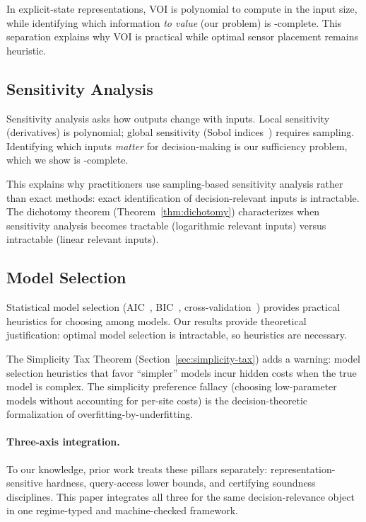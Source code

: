 In explicit-state representations, VOI is polynomial to compute in the input size, while identifying which information \emph{to value} (our problem) is \coNP-complete. This separation explains why VOI is practical while optimal sensor placement remains heuristic.

\subsection{Sensitivity Analysis}

Sensitivity analysis asks how outputs change with inputs. Local sensitivity (derivatives) is polynomial; global sensitivity (Sobol indices~\cite{sobol2001global}) requires sampling. Identifying which inputs \emph{matter} for decision-making is our sufficiency problem, which we show is \coNP-complete.

This explains why practitioners use sampling-based sensitivity analysis rather than exact methods: exact identification of decision-relevant inputs is intractable. The dichotomy theorem (Theorem~\ref{thm:dichotomy}) characterizes when sensitivity analysis becomes tractable (logarithmic relevant inputs) versus intractable (linear relevant inputs).

\subsection{Model Selection}

Statistical model selection (AIC~\cite{akaike1974new}, BIC~\cite{schwarz1978estimating}, cross-validation~\cite{stone1974cross}) provides practical heuristics for choosing among models. Our results provide theoretical justification: optimal model selection is intractable, so heuristics are necessary.

The Simplicity Tax Theorem (Section~\ref{sec:simplicity-tax}) adds a warning: model selection heuristics that favor ``simpler'' models incur hidden costs when the true model is complex. The simplicity preference fallacy (choosing low-parameter models without accounting for per-site costs) is the decision-theoretic formalization of overfitting-by-underfitting.

\paragraph{Three-axis integration.}
To our knowledge, prior work treats these pillars separately: representation-sensitive hardness, query-access lower bounds, and certifying soundness disciplines. This paper integrates all three for the same decision-relevance object in one regime-typed and machine-checked framework.
